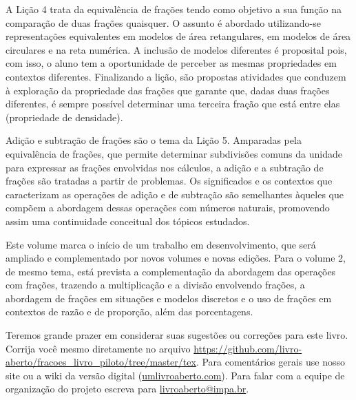 \documentclass[a4,12pt,openany]{book}
\begin{document}
A Lição 4 trata da equivalência de frações tendo como objetivo a sua função na comparação de duas frações quaisquer. O assunto é abordado utilizando-se representações equivalentes em modelos de área retangulares, em modelos de área circulares e na reta numérica. A inclusão de modelos diferentes é proposital pois, com isso, o aluno tem a oportunidade de perceber as mesmas propriedades em contextos diferentes. Finalizando a lição, são propostas atividades que conduzem à exploração da propriedade das frações que garante que, dadas duas frações diferentes, é sempre possível determinar uma terceira fração que está entre elas (propriedade de densidade).

Adição e subtração de frações são o tema da Lição 5. Amparadas pela equivalência de frações, que permite determinar subdivisões comuns da unidade para expressar as frações envolvidas nos cálculos, a adição e a subtração de frações são tratadas a partir de problemas. Os significados e os contextos que caracterizam as operações de adição e de subtração são semelhantes àqueles que compõem a abordagem dessas operações com números naturais, promovendo assim uma continuidade conceitual dos tópicos estudados.

Este volume marca o início de um trabalho em desenvolvimento, que será ampliado e complementado por novos volumes e novas edições. Para o volume 2, de mesmo tema, está prevista a complementação da abordagem das operações com frações, trazendo a multiplicação e a divisão envolvendo frações, a abordagem de frações em situações e modelos discretos e o uso de frações em contextos de razão e de proporção, além das porcentagens.

Teremos grande prazer em considerar suas sugestões ou correções para este livro. 
Corrija você mesmo diretamente no arquivo \url{https://github.com/livro-aberto/fracoes_livro_piloto/tree/master/tex}.
Para comentários gerais use nosso site ou a wiki da versão digital (\url{umlivroaberto.com}).
Para falar com a equipe de organização do projeto escreva para \url{livroaberto@impa.br}.
\end{document}
